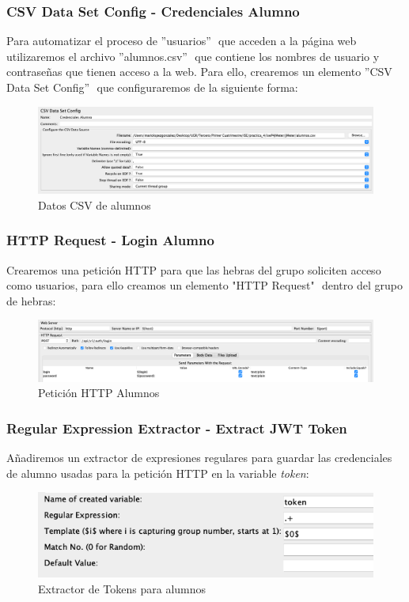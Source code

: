 \subsubsection{CSV Data Set Config - Credenciales Alumno}
Para automatizar el proceso de ''usuarios'' $ $ que acceden a la página web utilizaremos el archivo ''alumnos.csv'' $ $ que contiene los nombres de usuario y contraseñas
que tienen acceso a la web. Para ello, crearemos un elemento ''CSV Data Set Config'' $ $ que configuraremos de la siguiente forma:
\begin{figure}[H]
    \centering
    \includegraphics[scale=0.33]{images/csv_alumnos.png}
    \caption{Datos CSV de alumnos}
    \label{fig:csv_alumnos}
\end{figure}

\subsubsection{HTTP Request - Login Alumno}
Crearemos una petición HTTP para que las hebras del grupo soliciten acceso como usuarios, para ello creamos un elemento "HTTP Request" $ $ dentro del grupo de hebras:
\begin{figure}[H]
    \centering
    \includegraphics[scale=0.33]{images/login_alumnos.png}
    \caption{Petición HTTP Alumnos}
    \label{fig:login_alumnos}
\end{figure}

\subsubsection{Regular Expression Extractor - Extract JWT Token}
Añadiremos un extractor de expresiones regulares para guardar las credenciales de alumno usadas para la petición HTTP en la variable \emph{token}:
\begin{figure}[H]
    \centering
    \includegraphics[scale=0.6]{images/token_alumnos.png}
    \caption{Extractor de Tokens para alumnos}
    \label{fig:token_alumnos}
\end{figure}

